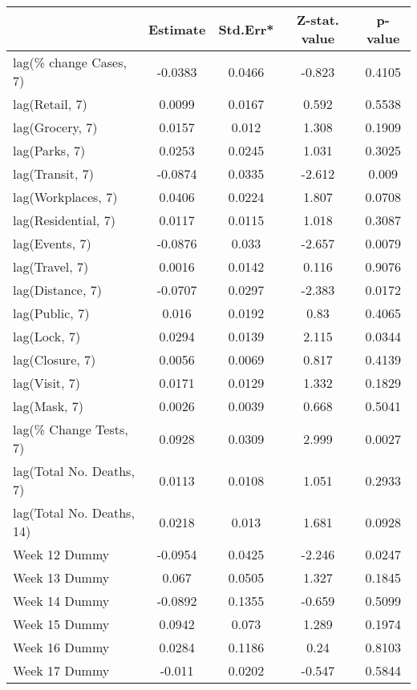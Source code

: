 \begingroup\tiny
\begin{longtable}{lcccc}
  \toprule
 & Estimate & Std.Err* & Z-stat. value & p-value \\ 
  \midrule
lag(\% change Cases, 7) & -0.0383 & 0.0466 & -0.823 & 0.4105 \\ 
  lag(Retail, 7) & 0.0099 & 0.0167 & 0.592 & 0.5538 \\ 
  lag(Grocery, 7) & 0.0157 & 0.012 & 1.308 & 0.1909 \\ 
  lag(Parks, 7) & 0.0253 & 0.0245 & 1.031 & 0.3025 \\ 
  lag(Transit, 7) & -0.0874 & 0.0335 & -2.612 & 0.009 \\ 
  lag(Workplaces, 7) & 0.0406 & 0.0224 & 1.807 & 0.0708 \\ 
  lag(Residential, 7) & 0.0117 & 0.0115 & 1.018 & 0.3087 \\ 
  lag(Events, 7) & -0.0876 & 0.033 & -2.657 & 0.0079 \\ 
  lag(Travel, 7) & 0.0016 & 0.0142 & 0.116 & 0.9076 \\ 
  lag(Distance, 7) & -0.0707 & 0.0297 & -2.383 & 0.0172 \\ 
  lag(Public, 7) & 0.016 & 0.0192 & 0.83 & 0.4065 \\ 
  lag(Lock, 7) & 0.0294 & 0.0139 & 2.115 & 0.0344 \\ 
  lag(Closure, 7) & 0.0056 & 0.0069 & 0.817 & 0.4139 \\ 
  lag(Visit, 7) & 0.0171 & 0.0129 & 1.332 & 0.1829 \\ 
  lag(Mask, 7) & 0.0026 & 0.0039 & 0.668 & 0.5041 \\ 
  lag(\% Change Tests, 7) & 0.0928 & 0.0309 & 2.999 & 0.0027 \\ 
  lag(Total No. Deaths, 7) & 0.0113 & 0.0108 & 1.051 & 0.2933 \\ 
  lag(Total No. Deaths, 14) & 0.0218 & 0.013 & 1.681 & 0.0928 \\ 
  Week 12 Dummy & -0.0954 & 0.0425 & -2.246 & 0.0247 \\ 
  Week 13 Dummy & 0.067 & 0.0505 & 1.327 & 0.1845 \\ 
  Week 14 Dummy & -0.0892 & 0.1355 & -0.659 & 0.5099 \\ 
  Week 15 Dummy & 0.0942 & 0.073 & 1.289 & 0.1974 \\ 
  Week 16 Dummy & 0.0284 & 0.1186 & 0.24 & 0.8103 \\ 
  Week 17 Dummy & -0.011 & 0.0202 & -0.547 & 0.5844 \\ 

\end{longtable}

